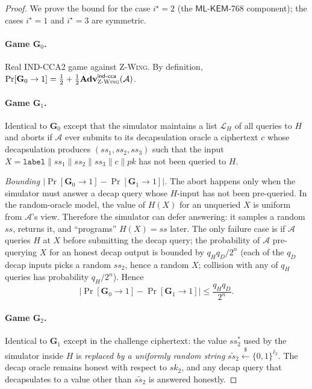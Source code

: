 \documentclass[11pt,a4paper]{article}
\theoremstyle{definition}
\theoremstyle{remark}
\newcommand{\Adv}{\ensuremath{\mathbf{Adv}}}
\providecommand{\Game}{}\renewcommand{\Game}{\ensuremath{\mathbf{G}}}
\newcommand{\zwing}{\textsc{Z-Wing}}
\newcommand{\mlkem}{\ensuremath{\mathsf{ML\text{-}KEM}}}
\newcommand{\BB}{\ensuremath{\{0,1\}}}
\begin{document}
\begin{proof}
We prove the bound for the case $i^\star = 2$ (the $\mlkem$-768 component);
the cases $i^\star = 1$ and $i^\star = 3$ are symmetric.

\paragraph{Game $\Game_0$.} Real IND-CCA2 game against \zwing{}.
By definition,
$\Pr[\Game_0 \to 1] = \frac{1}{2} + \frac{1}{2} \Adv^{\mathsf{ind\text{-}cca}}_{\zwing}(\mathcal{A})$.

\paragraph{Game $\Game_1$.} Identical to $\Game_0$ except that the simulator
maintains a list $\mathcal{L}_H$ of all queries to $H$ and aborts if
$\mathcal{A}$ ever submits to its decapsulation oracle a ciphertext $c$
whose decapsulation produces $(ss_1, ss_2, ss_3)$ such that the input
$X = \texttt{label} \parallel ss_1 \parallel ss_2 \parallel ss_3 \parallel c \parallel pk$
has not been queried to $H$.

\emph{Bounding $|\Pr[\Game_0 \to 1] - \Pr[\Game_1 \to 1]|$.}
The abort happens only when the simulator must answer a decap query whose
$H$-input has not been pre-queried. In the random-oracle model, the value of
$H(X)$ for an unqueried $X$ is uniform from $\mathcal{A}$'s view. Therefore
the simulator can defer answering: it samples a random $ss$, returns it, and
``programs'' $H(X) = ss$ later. The only failure case is if $\mathcal{A}$
queries $H$ at $X$ before submitting the decap query; the probability of
$\mathcal{A}$ pre-querying $X$ for an honest decap output is bounded by
$q_H q_D / 2^n$ (each of the $q_D$ decap inputs picks a random
$ss_2$, hence a random $X$; collision with any of $q_H$ queries has
probability $q_H/2^n$). Hence
\[
|\Pr[\Game_0 \to 1] - \Pr[\Game_1 \to 1]| \le \frac{q_H q_D}{2^n}.
\]

\paragraph{Game $\Game_2$.} Identical to $\Game_1$ except in the challenge
ciphertext: the value $ss_2^*$ used by the simulator inside $H$ is
\emph{replaced by a uniformly random string} $\widetilde{ss_2} \xleftarrow{\$} \BB^{\ell_2}$.
The decap oracle remains honest with respect to $sk_2$, and any decap query
that decapsulates to a value other than $\widetilde{ss_2}$ is answered honestly.


\end{proof}
\end{document}
